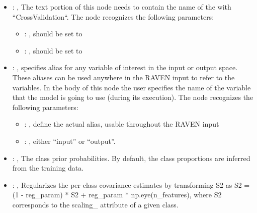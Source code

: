 \begin{itemize}
\begin{itemize}
        \item {}: ,
          List of IDs of features/variables to include in the transformation process.

        \item {}: ,
          Which space to search? Target or Feature?
      \end{itemize}

    \item {}: ,
      The text portion of this node needs to contain the name of the  with
               ``CrossValidation``.
      The  node recognizes the following parameters:
        \begin{itemize}
          \item {}: ,
            should be set to 
          \item {}: ,
            should be set to 
      \end{itemize}

    \item {}: ,
      specifies alias for         any variable of interest in the input or output space. These
      aliases can be used anywhere in the RAVEN input to         refer to the variables. In the body
      of this node the user specifies the name of the variable that the model is going to use
      (during its execution).
      The  node recognizes the following parameters:
        \begin{itemize}
          \item {}: ,
            define the actual alias, usable throughout the RAVEN input
          \item {}: ,
            either ``input'' or ``output''.
      \end{itemize}

    \item {}: ,
      The class prior probabilities. By default, the class
      proportions are inferred from the training data.

    \item {}: ,
      Regularizes the per-class covariance estimates by transforming
      S2 as S2 = (1 - reg\_param) * S2 + reg\_param * np.eye(n\_features),
      where S2 corresponds to the                                                  scaling\_
      attribute of a given class.


\end{itemize}
